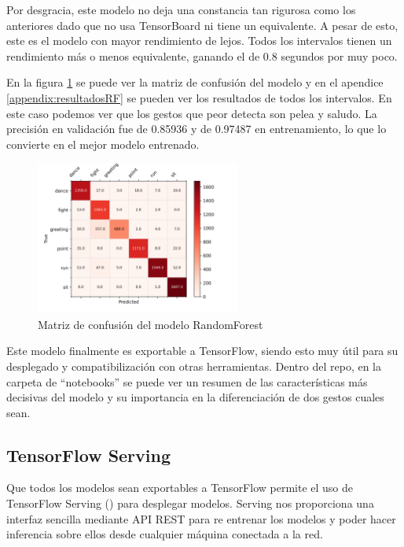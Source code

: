 Por desgracia, este modelo no deja una constancia tan rigurosa como los anteriores dado que no usa TensorBoard ni tiene un equivalente. A pesar de esto, este es el modelo con mayor rendimiento de lejos. Todos los intervalos tienen un rendimiento más o menos equivalente, ganando el de 0.8 segundos por muy poco.

En la figura \ref{fig:rf-0.8-matriz-ejemplo} se puede ver la matriz de confusión del modelo y en el apendice \ref{appendix:resultadosRF} se pueden ver los resultados de todos los intervalos. En este caso podemos ver que los gestos que peor detecta son pelea y saludo. La precisión en validación fue de 0.85936 y de 0.97487 en entrenamiento, lo que lo convierte en el mejor modelo entrenado.

\begin{figure}[H]
    \centering
    \includegraphics[width=0.6\textwidth]{Imagenes/Bitmap/CM_best_rf_0.8.png}
    \caption{Matriz de confusión del modelo RandomForest}
    \label{fig:rf-0.8-matriz-ejemplo}
\end{figure}

Este modelo finalmente es exportable a TensorFlow, siendo esto muy útil para su desplegado y compatibilización con otras herramientas. Dentro del repo, en la carpeta de ``notebooks'' se puede ver un resumen de las características más decisivas del modelo y su importancia en la diferenciación de dos gestos cuales sean.

\subsection{TensorFlow Serving}

Que todos los modelos sean exportables a TensorFlow permite el uso de TensorFlow Serving (\cite{olston2017tensorflowservingflexiblehighperformanceml}) para desplegar modelos. Serving nos proporciona una interfaz sencilla mediante \gls{API REST} para re entrenar los modelos y poder hacer inferencia sobre ellos desde cualquier máquina conectada a la red.

